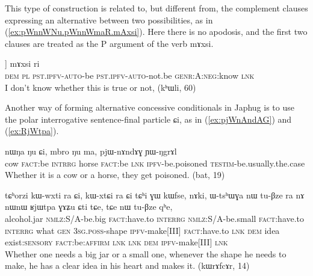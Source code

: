 \documentclass[oldfontcommands,oneside,a4paper,11pt]{article}
\newcommand{\ipa}[1]{{\phon \mbox{#1}}} %
\newcommand{\refb}[1]{(\ref{#1})}
\begin{document}
This type of construction is related to, but different from, the complement clauses expressing an alternative between two possibilities, as in \refb{ex:pWnnWNu.pWnnWmaR.mAxsi}. Here there is no apodosis, and the first two clauses are treated as the P argument of the verb \ipa{mɤxsi}.

\begin{exe}
\ex  \label{ex:pWnnWNu.pWnnWmaR.mAxsi}
\gll
 [[\ipa{nɯ} \ipa{ra}  	 \ipa{pɯ-nnɯ-ŋu}]  	 [\ipa{pɯ-nnɯ-maʁ}]]   	\ipa{mɤxsi}  \ipa{ri}\\
\textsc{dem} \textsc{pl} \textsc{pst.ipfv-auto}-be \textsc{pst.ipfv-auto}-not.be \textsc{genr:A:neg}:know \textsc{lnk} \\
\glt I don't know whether this is true or not, (kʰɯli, 60)
\end{exe}

Another way of forming alternative concessive conditionals in Japhug is to use the polar interrogative sentence-final particle \ipa{ɕi}, as in \refb{ex:pjWnAndAG} and \refb{ex:RjWtpa}.
\begin{exe}
\ex  \label{ex:pjWnAndAG}
\gll
\ipa{nɯŋa}   	\ipa{ŋu}   	\ipa{ɕi,}   	\ipa{mbro}   	\ipa{ŋu}   	\ipa{ma,}   	\ipa{pjɯ-nɤndɤɣ}   	\ipa{ɲɯ-ŋgrɤl}   \\
cow \textsc{fact}:be \textsc{intrrg} horse  \textsc{fact}:be \textsc{lnk} \textsc{ipfv}-be.poisoned \textsc{testim}-be.usually.the.case \\
\glt Whether it is a cow or a horse, they get poisoned. (bat, 19)
\end{exe}

\begin{exe}
\ex  \label{ex:RjWtpa}
\gll
\ipa{tɕʰorzi}   	\ipa{kɯ-wxti}   	\ipa{ra}   	\ipa{ɕi,}   	\ipa{kɯ-xtɕi}   	\ipa{ra}   	\ipa{ɕi}   	\ipa{tɕʰi}   	\ipa{ɣɯ}   	\ipa{kɯfse,}   	\ipa{nɤki,}   	\ipa{ɯ-tsʰɯɣa}   	\ipa{nɯ}   	\ipa{tu-βze}   	\ipa{ra}   	\ipa{nɤ}   	\ipa{nɯnɯ}   	\ipa{ʁjɯtpa}   	\ipa{ɣɤʑu}   	\ipa{ɕti}   	\ipa{tɕe,}   	\ipa{tɕe}   	\ipa{nɯ}   	\ipa{tu-βze}   	\ipa{qʰe,}   \\
alcohol.jar \textsc{nmlz}:S/A-be.big \textsc{fact}:have.to \textsc{interrg} \textsc{nmlz}:S/A-be.small \textsc{fact}:have.to \textsc{interrg} what \textsc{gen} \textsc{3sg.poss}-shape \textsc{ipfv}-make[III]  \textsc{fact}:have.to \textsc{lnk} \textsc{dem} idea
exist:\textsc{sensory} \textsc{fact}:be:\textsc{affirm} \textsc{lnk} \textsc{lnk} \textsc{dem} \textsc{ipfv}-make[III]  \textsc{lnk} \\
\glt Whether one needs a big jar or a small one, whenever the shape he needs to make, he has a clear idea in his heart and makes it. (kɯrɤfcɤr, 14)
\end{exe}
\end{document}
